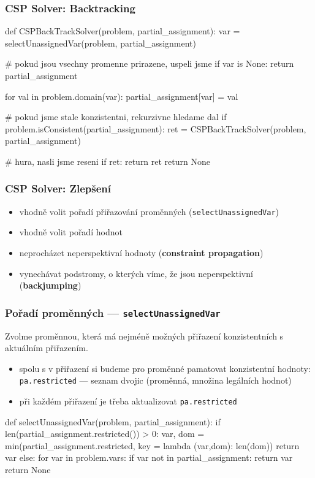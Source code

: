 \documentclass[red,professionalfont]{beamer}
\theoremstyle{definition}
\newcommand{\0}{\mbox{${\bf 0}$}}
\renewcommand{\emph}[1]{{\bf #1}}
\begin{document}
\begin{frame}[fragile]\frametitle{CSP Solver: Backtracking}
\begin{python}[basicstyle=\ttfamily\tiny\setstretch{1}]
def CSPBackTrackSolver(problem, partial_assignment):
  var = selectUnassignedVar(problem, partial_assignment)
  
  # pokud jsou vsechny promenne prirazene, uspeli jsme
  if var is None:
    return partial_assignment

  for val in problem.domain(var):
      partial_assignment[var] = val
      
      # pokud jsme stale konzistentni, rekurzivne hledame dal
      if problem.isConsistent(partial_assignment):
        ret = CSPBackTrackSolver(problem, partial_assignment)
        
        # hura, nasli jsme reseni
        if ret:
          return ret
  return None
\end{python}
\end{frame}

\begin{frame}[fragile]\frametitle{CSP Solver: Zlepšení}
 \begin{itemize}
  \item vhodně volit pořadí přiřazování proměnných ({\tt selectUnassignedVar})\pause
  \item vhodně volit pořadí hodnot\pause
  \item neprocházet neperspektivní hodnoty (\emph{constraint propagation})\pause
  \item vynechávat podstromy, o kterých víme, že jsou neperspektivní (\emph{backjumping})\pause
 \end{itemize}
\end{frame}

\begin{frame}[fragile]\frametitle{Pořadí proměnných --- {\tt selectUnassignedVar}}
\begin{block}{}
Zvolme proměnnou, která má nejméně možných přiřazení konzistentních s aktuálním přiřazením.
\end{block}\pause
\begin{itemize}
 \item spolu s v přiřazení si budeme pro proměnné pamatovat konzistentní hodnoty: {\tt pa.restricted} ---
       seznam dvojic (proměnná, množina legálních hodnot)\pause
 \item při každém přiřazení je třeba aktualizovat {\tt pa.restricted}
\end{itemize}\pause

\begin{python}[basicstyle=\ttfamily\tiny\setstretch{1}]
def selectUnassignedVar(problem, partial_assignment):
  if len(partial_assignment.restricted()) > 0:
    var, dom = min(partial_assignment.restricted, 
                   key = lambda (var,dom): len(dom))
    return var
  else:
    for var in problem.vars:
      if var not in partial_assignment:
        return var
  return None
\end{python}

\end{frame}
\end{document}
